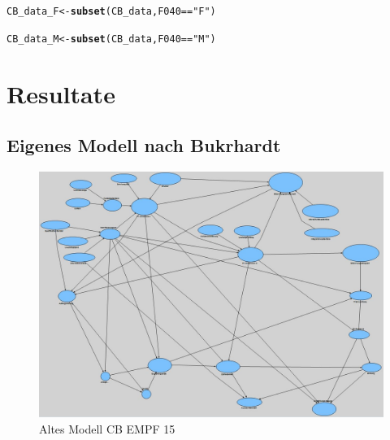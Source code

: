 \documentclass{article}\usepackage[]{graphicx}\usepackage[]{color}
\makeatletter
\newcommand{\hlstr}[1]{\textcolor[rgb]{0.192,0.494,0.8}{#1}}%
\newcommand{\hlopt}[1]{\textcolor[rgb]{0,0,0}{#1}}%
\newcommand{\hlstd}[1]{\textcolor[rgb]{0.345,0.345,0.345}{#1}}%
\newcommand{\hlkwb}[1]{\textcolor[rgb]{0.69,0.353,0.396}{#1}}%
\newcommand{\hlkwd}[1]{\textcolor[rgb]{0.737,0.353,0.396}{\textbf{#1}}}%
\newenvironment{kframe}{%
 \def\at@end@of@kframe{}%
 \ifinner\ifhmode%
  \def\at@end@of@kframe{\end{minipage}}%
  \begin{minipage}{\columnwidth}%
 \fi\fi%
 \def\FrameCommand##1{\hskip\@totalleftmargin \hskip-\fboxsep
 \colorbox{shadecolor}{##1}\hskip-\fboxsep
     \hskip-\linewidth \hskip-\@totalleftmargin \hskip\columnwidth}%
 \MakeFramed {\advance\hsize-\width
   \@totalleftmargin\z@ \linewidth\hsize
   \@setminipage}}%
 {\par\unskip\endMakeFramed%
 \at@end@of@kframe}
\newenvironment{knitrout}{}{} %
\makeatother
\begin{document}
\begin{knitrout}
\color{fgcolor}\begin{kframe}
\begin{alltt}
\hlstd{CB_data_F}\hlkwb{<-} \hlkwd{subset}\hlstd{(CB_data, F040} \hlopt{==} \hlstr{"F"}\hlstd{)}
\end{alltt}


{\ttfamily\noindent\bfseries\color{errorcolor}{\#\# Error: Objekt 'CB\_data' nicht gefunden}}\begin{alltt}
\hlstd{CB_data_M}\hlkwb{<-} \hlkwd{subset}\hlstd{(CB_data, F040} \hlopt{==} \hlstr{"M"}\hlstd{)}
\end{alltt}


{\ttfamily\noindent\bfseries\color{errorcolor}{\#\# Error: Objekt 'CB\_data' nicht gefunden}}\end{kframe}
\end{knitrout}




\newpage
\section{Resultate}%
\subsection{Eigenes Modell nach Bukrhardt}



\begin{figure}[h!]
\centering
\hspace*{-4.8cm}\includegraphics[scale = 0.8]{figure/ausgangsmodell}
\caption{Altes Modell CB EMPF 15}
\label{ausgangsmodell}
\end{figure}
\end{document}
